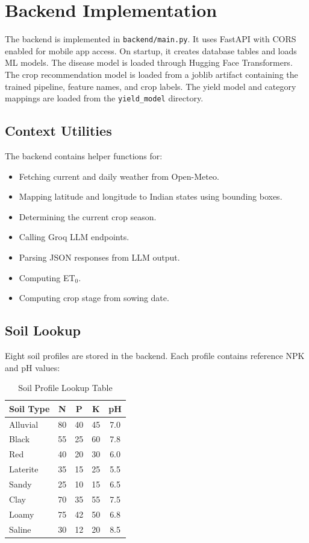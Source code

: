\documentclass[12pt,a4paper]{report}
\begin{document}
\section{Backend Implementation}

The backend is implemented in \texttt{backend/main.py}. It uses FastAPI with CORS enabled for mobile app access. On startup, it creates database tables and loads ML models. The disease model is loaded through Hugging Face Transformers. The crop recommendation model is loaded from a joblib artifact containing the trained pipeline, feature names, and crop labels. The yield model and category mappings are loaded from the \texttt{yield\_model} directory.

\subsection{Context Utilities}

The backend contains helper functions for:

\begin{itemize}[leftmargin=1.5em]
  \item Fetching current and daily weather from Open-Meteo.
  \item Mapping latitude and longitude to Indian states using bounding boxes.
  \item Determining the current crop season.
  \item Calling Groq LLM endpoints.
  \item Parsing JSON responses from LLM output.
  \item Computing ET$_0$.
  \item Computing crop stage from sowing date.
\end{itemize}

\subsection{Soil Lookup}

Eight soil profiles are stored in the backend. Each profile contains reference NPK and pH values:

\begin{table}[H]
\centering
\caption{Soil Profile Lookup Table}
\label{tab:soil}
\begin{tabular}{lcccc}
\toprule
\textbf{Soil Type} & \textbf{N} & \textbf{P} & \textbf{K} & \textbf{pH} \\
\midrule
Alluvial & 80 & 40 & 45 & 7.0 \\
Black & 55 & 25 & 60 & 7.8 \\
Red & 40 & 20 & 30 & 6.0 \\
Laterite & 35 & 15 & 25 & 5.5 \\
Sandy & 25 & 10 & 15 & 6.5 \\
Clay & 70 & 35 & 55 & 7.5 \\
Loamy & 75 & 42 & 50 & 6.8 \\
Saline & 30 & 12 & 20 & 8.5 \\
\bottomrule
\end{tabular}
\end{table}
\end{document}

